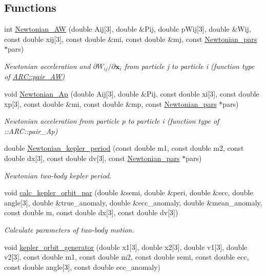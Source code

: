 \subsection*{Functions}
\begin{DoxyCompactItemize}
\item 
int \hyperlink{namespaceNTA_aecd205ef07c4302cd04d04218c4426e6}{Newtonian\+\_\+\+AW} (double Aij\mbox{[}3\mbox{]}, double \&Pij, double p\+Wij\mbox{[}3\mbox{]}, double \&Wij, const double xij\mbox{[}3\mbox{]}, const double \&mi, const double \&mj, const \hyperlink{classNTA_1_1Newtonian__pars}{Newtonian\+\_\+pars} $\ast$pars)
\begin{DoxyCompactList}\small\item\em Newtonian acceleration and $\partial W_{ij}/\partial \mathbf{x}_i$ from particle j to particle i (function type of \hyperlink{}{A\+R\+C\+::pair\+\_\+\+AW}) \end{DoxyCompactList}\item 
void \hyperlink{namespaceNTA_a5596f8660861d6e23c0827e381908641}{Newtonian\+\_\+\+Ap} (double Aij\mbox{[}3\mbox{]}, double \&Pij, const double xi\mbox{[}3\mbox{]}, const double xp\mbox{[}3\mbox{]}, const double \&mi, const double \&mp, const \hyperlink{classNTA_1_1Newtonian__pars}{Newtonian\+\_\+pars} $\ast$pars)
\begin{DoxyCompactList}\small\item\em Newtonian acceleration from particle p to particle i (function type of \+::\+A\+R\+C\+::pair\+\_\+\+Ap) \end{DoxyCompactList}\item 
double \hyperlink{namespaceNTA_a387c8276183c856f55e73a719977d437}{Newtonian\+\_\+kepler\+\_\+period} (const double m1, const double m2, const double dx\mbox{[}3\mbox{]}, const double dv\mbox{[}3\mbox{]}, const \hyperlink{classNTA_1_1Newtonian__pars}{Newtonian\+\_\+pars} $\ast$pars)
\begin{DoxyCompactList}\small\item\em Newtonian two-\/body kepler period. \end{DoxyCompactList}\item 
void \hyperlink{namespaceNTA_a02d22f02e21004b264c8257a5ffbb600}{calc\+\_\+kepler\+\_\+orbit\+\_\+par} (double \&semi, double \&peri, double \&ecc, double angle\mbox{[}3\mbox{]}, double \&true\+\_\+anomaly, double \&ecc\+\_\+anomaly, double \&mean\+\_\+anomaly, const double m, const double dx\mbox{[}3\mbox{]}, const double dv\mbox{[}3\mbox{]})
\begin{DoxyCompactList}\small\item\em Calculate parameters of two-\/body motion. \end{DoxyCompactList}\item 
void \hyperlink{namespaceNTA_a621b3643cd91a5a7ea23b7b22481f121}{kepler\+\_\+orbit\+\_\+generator} (double x1\mbox{[}3\mbox{]}, double x2\mbox{[}3\mbox{]}, double v1\mbox{[}3\mbox{]}, double v2\mbox{[}3\mbox{]}, const double m1, const double m2, const double semi, const double ecc, const double angle\mbox{[}3\mbox{]}, const double ecc\+\_\+anomaly)
\end{DoxyCompactItemize}


